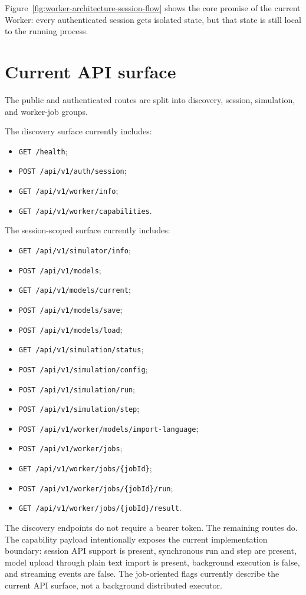Figure~\ref{fig:worker-architecture-session-flow} shows the core promise of the current Worker: every authenticated session gets isolated state, but that state is still local to the running process.

\section{Current API surface}
\label{sec:worker-architecture-api-surface}

The public and authenticated routes are split into discovery, session, simulation, and worker-job groups.

The discovery surface currently includes:
\begin{itemize}
\item \texttt{GET /health};
\item \texttt{POST /api/v1/auth/session};
\item \texttt{GET /api/v1/worker/info};
\item \texttt{GET /api/v1/worker/capabilities}.
\end{itemize}

The session-scoped surface currently includes:
\begin{itemize}
\item \texttt{GET /api/v1/simulator/info};
\item \texttt{POST /api/v1/models};
\item \texttt{GET /api/v1/models/current};
\item \texttt{POST /api/v1/models/save};
\item \texttt{POST /api/v1/models/load};
\item \texttt{GET /api/v1/simulation/status};
\item \texttt{POST /api/v1/simulation/config};
\item \texttt{POST /api/v1/simulation/run};
\item \texttt{POST /api/v1/simulation/step};
\item \texttt{POST /api/v1/worker/models/import-language};
\item \texttt{POST /api/v1/worker/jobs};
\item \texttt{GET /api/v1/worker/jobs/\{jobId\}};
\item \texttt{POST /api/v1/worker/jobs/\{jobId\}/run};
\item \texttt{GET /api/v1/worker/jobs/\{jobId\}/result}.
\end{itemize}

The discovery endpoints do not require a bearer token. The remaining routes do. The capability payload intentionally exposes the current implementation boundary: session API support is present, synchronous run and step are present, model upload through plain text import is present, background execution is false, and streaming events are false. The job-oriented flags currently describe the current API surface, not a background distributed executor.


